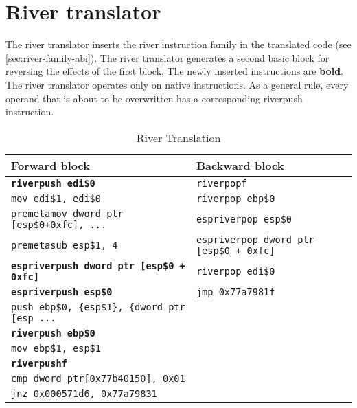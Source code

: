 \documentclass[12pt]{report}
\begin{document}
\section{River translator}
\label{sec:river-translator}
The river translator inserts the river instruction family in the translated code (see \autoref{sec:river-family-abi}). The river translator generates a second basic block for reversing the effects of the first block. The newly inserted instructions are \textbf{bold}. The river translator operates only on native instructions. As a general rule, every operand that is about to be overwritten has a corresponding riverpush instruction.\\
\begin{table}[H]
	\begin{tabular}{| l | l |}
		\hline
		\textbf{Forward block}							& \textbf{Backward block}\\ \hline
		\texttt{\textbf{riverpush edi\$0}}						 & \texttt{riverpopf}\\
		\texttt{mov edi\$1, edi\$0}								 & \texttt{riverpop ebp\$0}\\
		\texttt{premetamov dword ptr [esp\$0+0xfc], ...}		 & \texttt{espriverpop esp\$0}\\
		\texttt{premetasub esp\$1, 4}							 & \texttt{espriverpop dword ptr [esp\$0 + 0xfc]}\\
		\texttt{\textbf{espriverpush dword ptr [esp\$0 + 0xfc]}} & \texttt{riverpop edi\$0}\\
		\texttt{\textbf{espriverpush esp\$0}}					 & \texttt{jmp 0x77a7981f}\\
		\texttt{push ebp\$0, \{esp\$1\}, \{dword ptr [esp ...}   & \\
		\texttt{\textbf{riverpush ebp\$0}}						 & \\
		\texttt{mov ebp\$1, esp\$1}								 & \\
		\texttt{\textbf{riverpushf}}							 & \\
		\texttt{cmp dword ptr[0x77b40150], 0x01}				 & \\
		\texttt{jnz 0x000571d6, 0x77a79831}						 & \\ \hline
	\end{tabular}
	\caption{River Translation}
\end{table}
\end{document}
